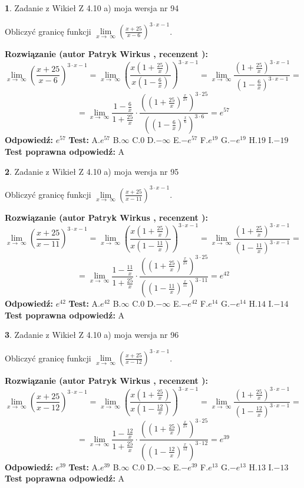 \documentclass[12pt, a4paper]{article}
\theoremstyle{definition} %
\newtheorem{zad}{}
\newcommand{\zadStart}[1]{\begin{zad}#1\newline}
\newcommand{\zadStop}{\end{zad}}
\newcommand{\rozwStart}[2]{\noindent \textbf{Rozwiązanie (autor #1 , recenzent #2): }\newline}
\newcommand{\rozwStop}{\newline}
\newcommand{\odpStart}{\noindent \textbf{Odpowiedź:}\newline}
\newcommand{\odpStop}{\newline}
\newcommand{\testStart}{\noindent \textbf{Test:}\newline}
\newcommand{\testStop}{\newline}
\newcommand{\kluczStart}{\noindent \textbf{Test poprawna odpowiedź:}\newline}
\newcommand{\kluczStop}{\newline}
\begin{document}
\zadStart{Zadanie z Wikieł Z 4.10 a) moja wersja nr 94}

Obliczyć granicę funkcji  $\lim\limits_{x\to\ \infty}(\frac{x+25}{x-6})^{3\cdot x-1}$.
\zadStop
\rozwStart{Patryk Wirkus}{}
$$\lim\limits_{x\to\ \infty}(\frac{x+25}{x-6})^{3\cdot x-1} = \lim\limits_{x\to\ \infty}(\frac{x(1+\frac{25}{x})}{x(1-\frac{6}{x})})^{3\cdot x-1}=\lim\limits_{x\to\ \infty}\frac{(1+\frac{25}{x})^{3\cdot x-1}}{(1-\frac{6}{x})^{3\cdot x-1}}=$$
$$=\lim\limits_{x\to\ \infty}\frac{1-\frac{6}{x}}{1+\frac{25}{x}}\cdot\frac{((1+\frac{25}{x})^{\frac{x}{25}})^{3\cdot25}}{((1-\frac{6}{x})^{\frac{x}{6}})^{3\cdot6}}=e^{57}$$
\rozwStop
\odpStart
$e^{57}$
\odpStop
\testStart
A.$e^{57}$ B.$\infty$ C.$0$ D.$-\infty$ E.$-e^{57}$
F.$e^{19}$ G.$-e^{19}$
H.$19$
I.$-19$
\testStop
\kluczStart
A
\kluczStop



\zadStart{Zadanie z Wikieł Z 4.10 a) moja wersja nr 95}

Obliczyć granicę funkcji  $\lim\limits_{x\to\ \infty}(\frac{x+25}{x-11})^{3\cdot x-1}$.
\zadStop
\rozwStart{Patryk Wirkus}{}
$$\lim\limits_{x\to\ \infty}(\frac{x+25}{x-11})^{3\cdot x-1} = \lim\limits_{x\to\ \infty}(\frac{x(1+\frac{25}{x})}{x(1-\frac{11}{x})})^{3\cdot x-1}=\lim\limits_{x\to\ \infty}\frac{(1+\frac{25}{x})^{3\cdot x-1}}{(1-\frac{11}{x})^{3\cdot x-1}}=$$
$$=\lim\limits_{x\to\ \infty}\frac{1-\frac{11}{x}}{1+\frac{25}{x}}\cdot\frac{((1+\frac{25}{x})^{\frac{x}{25}})^{3\cdot25}}{((1-\frac{11}{x})^{\frac{x}{11}})^{3\cdot11}}=e^{42}$$
\rozwStop
\odpStart
$e^{42}$
\odpStop
\testStart
A.$e^{42}$ B.$\infty$ C.$0$ D.$-\infty$ E.$-e^{42}$
F.$e^{14}$ G.$-e^{14}$
H.$14$
I.$-14$
\testStop
\kluczStart
A
\kluczStop



\zadStart{Zadanie z Wikieł Z 4.10 a) moja wersja nr 96}

Obliczyć granicę funkcji  $\lim\limits_{x\to\ \infty}(\frac{x+25}{x-12})^{3\cdot x-1}$.
\zadStop
\rozwStart{Patryk Wirkus}{}
$$\lim\limits_{x\to\ \infty}(\frac{x+25}{x-12})^{3\cdot x-1} = \lim\limits_{x\to\ \infty}(\frac{x(1+\frac{25}{x})}{x(1-\frac{12}{x})})^{3\cdot x-1}=\lim\limits_{x\to\ \infty}\frac{(1+\frac{25}{x})^{3\cdot x-1}}{(1-\frac{12}{x})^{3\cdot x-1}}=$$
$$=\lim\limits_{x\to\ \infty}\frac{1-\frac{12}{x}}{1+\frac{25}{x}}\cdot\frac{((1+\frac{25}{x})^{\frac{x}{25}})^{3\cdot25}}{((1-\frac{12}{x})^{\frac{x}{12}})^{3\cdot12}}=e^{39}$$
\rozwStop
\odpStart
$e^{39}$
\odpStop
\testStart
A.$e^{39}$ B.$\infty$ C.$0$ D.$-\infty$ E.$-e^{39}$
F.$e^{13}$ G.$-e^{13}$
H.$13$
I.$-13$
\testStop
\kluczStart
A
\kluczStop
\end{document}
